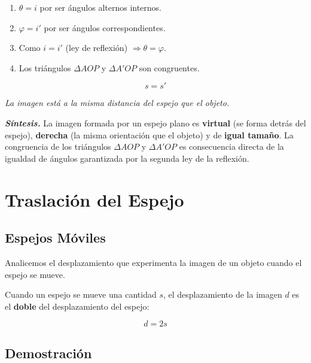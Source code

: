 \documentclass[12pt, a4paper]{article}
\theoremstyle{definition}
\begin{document}
\begin{enumerate}
  \item \(\theta = i\) por ser ángulos alternos internos.
  \item \(\varphi = i'\) por ser ángulos correspondientes.
  \item Como \(i = i'\) (ley de reflexión) \(\Rightarrow \theta = \varphi\).
  \item Los triángulos \(\Delta AOP\) y \(\Delta A'OP\) son congruentes.
\end{enumerate}

\begin{equation}
  s = s'
  \label{eq:imagen_plano}
\end{equation}

\begin{center}
  \textit{La imagen está a la misma distancia del espejo que el objeto.}
\end{center}

\textit{\textbf{Síntesis.}} La imagen formada por un espejo plano es \textbf{virtual} (se forma detrás del espejo), \textbf{derecha} (la misma orientación que el objeto) y de \textbf{igual tamaño}. La congruencia de los triángulos \(\Delta AOP\) y \(\Delta A'OP\) es consecuencia directa de la igualdad de ángulos garantizada por la segunda ley de la reflexión.

\section{Traslación del Espejo}

\subsection{Espejos Móviles}

Analicemos el desplazamiento que experimenta la imagen de un objeto cuando el espejo se mueve.

Cuando un espejo se mueve una cantidad \(s\), el desplazamiento de la imagen \(d\) es el \textbf{doble} del desplazamiento del espejo:

\begin{equation}
  d = 2s
  \label{eq:traslacion}
\end{equation}

\subsection{Demostración}
\end{document}
